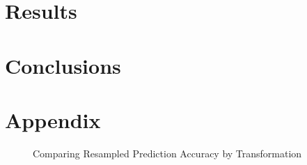 \documentclass[16pt,twocolumn,letterpaper,titlepage]{article}
\begin{document}
\section{Results}


\section{Conclusions}


\clearpage
\onecolumn



\section{Appendix}

\begin{figure}[!htb]
	\caption{\label{fig:my-label} Comparing Resampled Prediction Accuracy by Transformation}
	
\end{figure}
\end{document}

